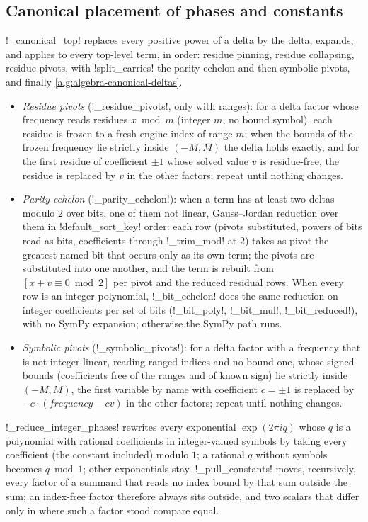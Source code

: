 \subsection{Canonical placement of phases and constants}\label{sec:algebra-simplify-canon}

\py!_canonical_top! replaces every positive power of a delta by the delta, expands, and applies to every top-level term, in order: residue pinning, residue collapsing, residue pivots, with \code!split_carries! the parity echelon and then symbolic pivots, and finally \cref{alg:algebra-canonical-deltas}.
\begin{itemize}
\item \emph{Residue pivots} (\py!_residue_pivots!, only with ranges): for a delta factor whose frequency reads residues $x\bmod m$ (integer $m$, no bound symbol), each residue is frozen to a fresh engine index of range $m$; when the bounds of the frozen frequency lie strictly inside $(-M,M)$ the delta holds exactly, and for the first residue of coefficient $\pm1$ whose solved value $v$ is residue-free, the residue is replaced by $v$ in the other factors; repeat until nothing changes.
\item \emph{Parity echelon} (\py!_parity_echelon!): when a term has at least two deltas modulo $2$ over bits, one of them not linear, Gauss--Jordan reduction over them in \py!default_sort_key! order: each row (pivots substituted, powers of bits read as bits, coefficients through \py!_trim_mod! at $2$) takes as pivot the greatest-named bit that occurs only as its own term; the pivots are substituted into one another, and the term is rebuilt from $[x+v\equiv0\bmod2]$ per pivot and the reduced residual rows. When every row is an integer polynomial, \py!_bit_echelon! does the same reduction on integer coefficients per set of bits (\py!_bit_poly!, \py!_bit_mul!, \py!_bit_reduced!), with no SymPy expansion; otherwise the SymPy path runs.
\item \emph{Symbolic pivots} (\py!_symbolic_pivots!): for a delta factor with a frequency that is not integer-linear, reading ranged indices and no bound one, whose signed bounds (coefficients free of the ranges and of known sign) lie strictly inside $(-M,M)$, the first variable by name with coefficient $c=\pm1$ is replaced by $-c\cdot(\mathit{frequency}-cv)$ in the other factors; repeat until nothing changes.
\end{itemize} \py!_reduce_integer_phases! rewrites every exponential $\exp(2\pi i q)$ whose $q$ is a polynomial with rational coefficients in integer-valued symbols by taking every coefficient (the constant included) modulo $1$; a rational $q$ without symbols becomes $q\bmod 1$; other exponentials stay. \py!_pull_constants! moves, recursively, every factor of a summand that reads no index bound by that sum outside the sum; an index-free factor therefore always sits outside, and two scalars that differ only in where such a factor stood compare equal.

